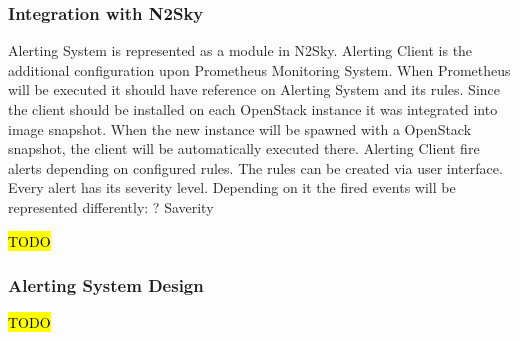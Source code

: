\subsubsection{Integration with N2Sky}\label{Integration with N2Sky Alerting}

Alerting System is represented as a module in N2Sky. 
Alerting Client is the additional configuration upon Prometheus Monitoring System. When Prometheus will be executed it should have reference on Alerting System and its rules. 
Since the client should be installed on each OpenStack instance it was integrated into image snapshot. When the new instance will be spawned with a OpenStack snapshot, the client will be automatically executed there.  
Alerting Client fire alerts depending on configured rules. The rules can be created via user interface. Every alert has its severity level. Depending on it the fired events will be represented differently: 
?	Saverity 

\hl{TODO}

\subsubsection{Alerting System Design}\label{Alerting System Design}
\hl{TODO}



